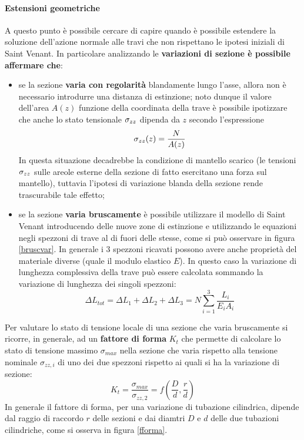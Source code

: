 		\paragraph{Estensioni geometriche} A questo punto è possibile cercare di capire quando è possibile estendere la soluzione dell'azione normale alle travi che non rispettano le ipotesi iniziali di Saint Venant. In particolare analizzando le \textbf{variazioni di sezione è possibile affermare che}:
		\begin{itemize}
			\item se la sezione \textbf{varia con regolarità} blandamente lungo l'asse, allora non è necessario introdurre una distanza di estinzione; noto dunque il valore dell'area $A(z)$ funzione della coordinata della trave è possibile ipotizzare che anche lo stato tensionale $\sigma_{zz}$ dipenda da $z$ secondo l'espressione
			\[ \sigma_{zz} (z) = \frac N {A(z)} \]
			In questa situazione decadrebbe la condizione di mantello scarico (le tensioni $\sigma_{zz}$ sulle areole esterne della sezione di fatto esercitano una forza sul mantello), tuttavia l'ipotesi di variazione blanda della sezione rende trascurabile tale effetto;
			
			\item se la sezione \textbf{varia bruscamente} è possibile utilizzare il modello di Saint Venant introducendo delle nuove  zone di estinzione e utilizzando le equazioni negli spezzoni di trave al di fuori delle stesse, come si può osservare in figura \ref{bruscvar}. In generale i 3 spezzoni ricavati possono avere anche proprietà del materiale diverse (quale il modulo elastico $E$). In questo caso la variazione di lunghezza complessiva  della trave può essere calcolata sommando la variazione di lunghezza dei singoli spezzoni:
			\[ \Delta L_{tot} = \Delta L_1 + \Delta L_2 + \Delta L_3 = N \sum_{i=1}^{3} \frac{L_i}{E_iA_i} \]
			
		\end{itemize}
		
		
		\begin{concetto} \label{conc:sv:fattoreforma}
			Per valutare lo stato di tensione locale di una sezione che varia bruscamente si ricorre, in generale, ad un \textbf{fattore di forma} $K_t$ che permette di calcolare lo stato di tensione massimo $\sigma_{max}$ nella sezione che varia rispetto alla tensione nominale $\sigma_{zz,i}$ di uno dei due spezzoni rispetto ai quali si ha la variazione di sezione:
			\begin{equation}
				K_t = \frac{\sigma_{max}}{\sigma_{zz,2}} = f\left(\frac D d, \frac r d\right)
			\end{equation}
			In generale il fattore di forma, per una variazione di tubazione cilindrica, dipende dal raggio di raccordo $r$ delle sezioni e dai diamtri $D$ e $d$ delle due tubazioni cilindriche, come si osserva in figura \ref{fforma}.
		\end{concetto}
	
